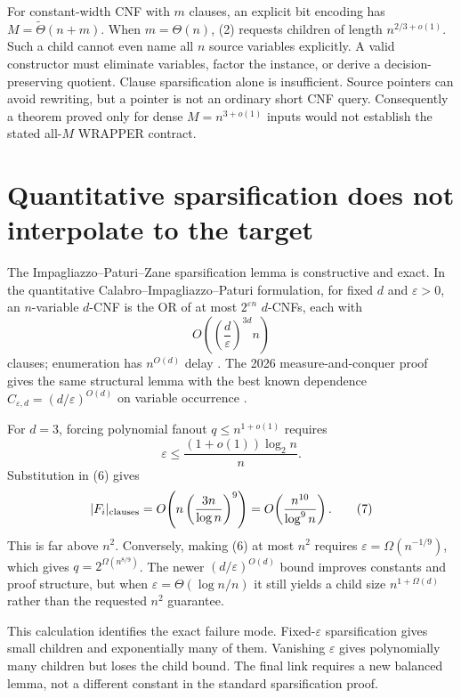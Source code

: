 \documentclass[11pt]{article}
\begin{document}
For constant-width CNF with $m$ clauses, an explicit bit encoding has
$M=\widetilde\Theta(n+m)$.  When $m=\Theta(n)$, (2) requests children of
length $n^{2/3+o(1)}$.  Such a child cannot even name all $n$ source
variables explicitly.  A valid constructor must eliminate variables,
factor the instance, or derive a decision-preserving quotient.  Clause
sparsification alone is insufficient.  Source pointers can avoid rewriting,
but a pointer is not an ordinary short CNF query.  Consequently a theorem
proved only for dense $M=n^{3+o(1)}$ inputs would not establish the stated
all-$M$ WRAPPER contract.

\section{Quantitative sparsification does not interpolate to the target}

The Impagliazzo--Paturi--Zane sparsification lemma is constructive and exact.
In the quantitative Calabro--Impagliazzo--Paturi formulation, for fixed
$d$ and $\varepsilon>0$, an $n$-variable $d$-CNF is the OR of at most
$2^{\varepsilon n}$ $d$-CNFs, each with
\begin{equation}
 O\!\left(\left(\frac d\varepsilon\right)^{3d}n\right)
 \tag{6}
\end{equation}
clauses; enumeration has $n^{O(d)}$ delay
\cite{ipz2001,calabroimpagliazzopaturi2010}.  The 2026 measure-and-conquer
proof gives the same structural lemma with the best known dependence
$C_{\varepsilon,d}=(d/\varepsilon)^{O(d)}$ on variable occurrence
\cite{lokshtanov2026}.

For $d=3$, forcing polynomial fanout $q\le n^{1+o(1)}$ requires
\[
 \varepsilon\le\frac{(1+o(1))\log_2 n}{n}.
\]
Substitution in (6) gives
\[
 |F_i|_{\rm clauses}
 =O\!\left(n\left(\frac{3n}{\log n}\right)^9\right)
 =O\!\left(\frac{n^{10}}{\log^9 n}\right). \tag{7}
\]
This is far above $n^2$.  Conversely, making (6) at most $n^2$ requires
$\varepsilon=\Omega(n^{-1/9})$, which gives
$q=2^{\Omega(n^{8/9})}$.  The newer
$(d/\varepsilon)^{O(d)}$ bound improves constants and proof structure, but
when $\varepsilon=\Theta(\log n/n)$ it still yields a child size
$n^{1+\Omega(d)}$ rather than the requested $n^2$ guarantee.

This calculation identifies the exact failure mode.  Fixed-$\varepsilon$
sparsification gives small children and exponentially many of them.
Vanishing $\varepsilon$ gives polynomially many children but loses the child
bound.  The final link requires a new balanced lemma, not a different
constant in the standard sparsification proof.
\end{document}
